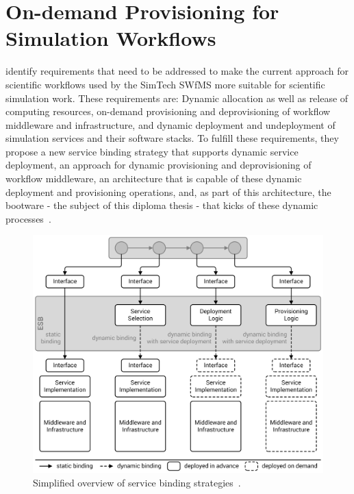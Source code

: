 \section{On-demand Provisioning for Simulation Workflows}
\label{related:ondemand}

\citeauthor{provisioning:ondemand} identify requirements that need to be addressed to make the current approach for scientific workflows used by the SimTech SWfMS more suitable for scientific simulation work.
These requirements are: Dynamic allocation as well as release of computing resources, on-demand provisioning and deprovisioning of workflow middleware and infrastructure, and dynamic deployment and undeployment of simulation services and their software stacks.
To fulfill these requirements, they propose a new service binding strategy that supports dynamic service deployment, an approach for dynamic provisioning and deprovisioning of workflow middleware, an architecture that is capable of these dynamic deployment and provisioning operations, and, as part of this architecture, the bootware - the subject of this diploma thesis - that kicks of these dynamic processes~\autocite{provisioning:ondemand}.

\begin{figure}[!htbp]
	\centering
	\includegraphics[resolution=600]{related/assets/service_binding_strategies}
	\caption{Simplified overview of service binding strategies~\autocite[based on][]{provisioning:ondemand}.}
	\label{image:service_binding_strategies}
\end{figure}

